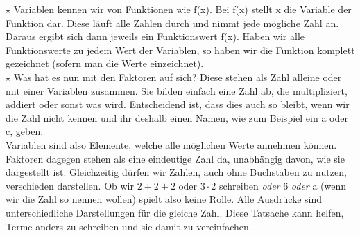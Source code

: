 	\(\star\) Variablen kennen wir von Funktionen wie f(x). Bei f(x) stellt x die
	Variable der Funktion dar. Diese läuft alle Zahlen durch und nimmt jede
	mögliche Zahl an. Daraus ergibt sich dann jeweils ein Funktionswert f(x). Haben
	wir alle Funktionswerte zu jedem Wert der Variablen, so haben wir die Funktion
	komplett gezeichnet (sofern man die Werte einzeichnet). \\
	
	\(\star\) Was hat es nun mit den Faktoren auf sich? Diese stehen als Zahl
	alleine oder mit einer Variablen zusammen. Sie bilden einfach eine Zahl ab, die
	multipliziert, addiert oder sonst was wird. Entscheidend ist, dass dies auch so
	bleibt, wenn wir die Zahl nicht kennen und ihr deshalb einen Namen, wie zum
	Beispiel ein a oder c, geben.\\
	Variablen sind also Elemente, welche alle möglichen Werte annehmen können.
	Faktoren dagegen stehen als eine eindeutige Zahl da, unabhängig davon, wie sie
	dargestellt ist.
	Gleichzeitig dürfen wir Zahlen, auch ohne Buchstaben zu nutzen, verschieden
	darstellen. Ob wir \(2+2+2\text{ oder }3\cdot 2\) schreiben \textit{oder} 6
	\textit{oder} a (wenn wir die Zahl so nennen wollen) spielt also keine Rolle.
	Alle Ausdrücke sind unterschiedliche Darstellungen für die gleiche Zahl. Diese
	Tatsache kann helfen, Terme anders zu schreiben und sie damit zu
	vereinfachen.\\
